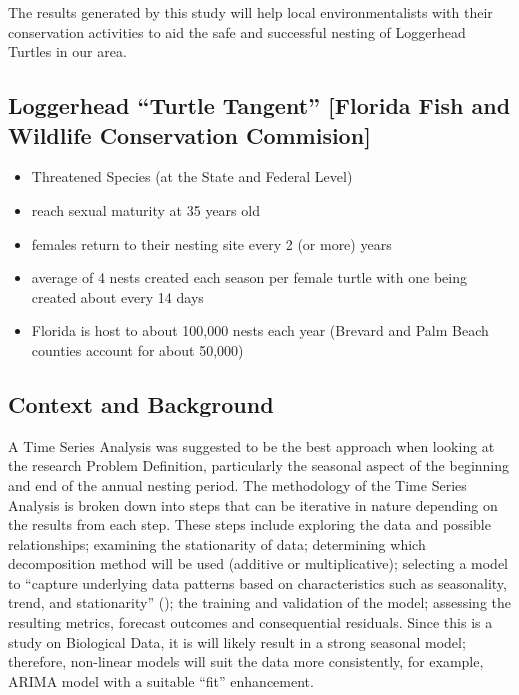 \documentclass[
  letterpaper,
  DIV=11,
  numbers=noendperiod]{scrartcl}
\providecommand{\tightlist}{%
  \setlength{\itemsep}{0pt}\setlength{\parskip}{0pt}}\usepackage{longtable,booktabs,array}
\begin{document}
The results generated by this study will help local environmentalists
with their conservation activities to aid the safe and successful
nesting of Loggerhead Turtles in our area.

\subsection{Loggerhead ``Turtle Tangent'' {[}Florida Fish and Wildlife
Conservation
Commision{]}}\label{loggerhead-turtle-tangent-florida-fish-and-wildlife-conservation-commision}

\begin{itemize}
\tightlist
\item
  Threatened Species (at the State and Federal Level)
\item
  reach sexual maturity at 35 years old
\item
  females return to their nesting site every 2 (or more) years
\item
  average of 4 nests created each season per female turtle with one
  being created about every 14 days
\item
  Florida is host to about 100,000 nests each year (Brevard and Palm
  Beach counties account for about 50,000)
\end{itemize}

\subsection{Context and Background}\label{context-and-background}

A Time Series Analysis was suggested to be the best approach when
looking at the research Problem Definition, particularly the seasonal
aspect of the beginning and end of the annual nesting period. The
methodology of the Time Series Analysis is broken down into steps that
can be iterative in nature depending on the results from each step.
These steps include exploring the data and possible relationships;
examining the stationarity of data; determining which decomposition
method will be used (additive or multiplicative); selecting a model to
``capture underlying data patterns based on characteristics such as
seasonality, trend, and stationarity''
(); the training and validation
of the model; assessing the resulting metrics, forecast outcomes and
consequential residuals. Since this is a study on Biological Data, it is
will likely result in a strong seasonal model; therefore, non-linear
models will suit the data more consistently, for example, ARIMA model
with a suitable ``fit'' enhancement.
\end{document}
